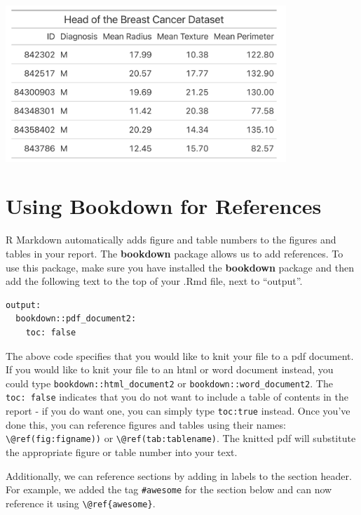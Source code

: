 \documentclass[
  letterpaper,
]{krantz}
\begin{document}
\begin{center}
\includegraphics[width=4.16667in,height=\textheight]{book/images/rmarkdown_reports/example-gt.png}
\end{center}

\section{Using Bookdown for
References}\label{using-bookdown-for-references}

R Markdown automatically adds figure and table numbers to the figures
and tables in your report. The \textbf{bookdown} package allows us to
add references. To use this package, make sure you have installed the
\textbf{bookdown} package and then add the following text to the top of
your .Rmd file, next to ``output''.

\begin{verbatim}
output:
  bookdown::pdf_document2:
    toc: false
\end{verbatim}

The above code specifies that you would like to knit your file to a pdf
document. If you would like to knit your file to an html or word
document instead, you could type \texttt{bookdown::html\_document2} or
\texttt{bookdown::word\_document2}. The \texttt{toc:\ false} indicates
that you do not want to include a table of contents in the report - if
you do want one, you can simply type \texttt{toc:true} instead. Once
you've done this, you can reference figures and tables using their
names: \texttt{\textbackslash{}@ref(fig:figname))} or
\texttt{\textbackslash{}@ref(tab:tablename)}. The knitted pdf will
substitute the appropriate figure or table number into your text.

Additionally, we can reference sections by adding in labels to the
section header. For example, we added the tag \texttt{\#awesome} for the
section below and can now reference it using
\texttt{\textbackslash{}@ref\{awesome\}}.
\end{document}
